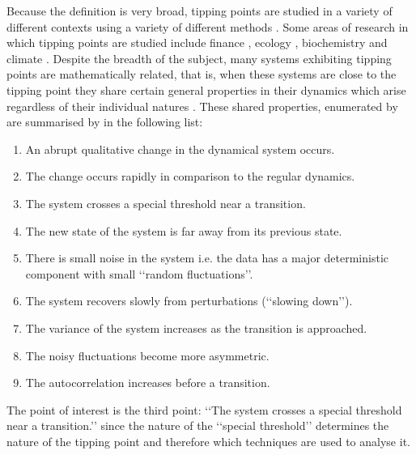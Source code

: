 Because the definition is very broad, tipping points are studied in a variety of different contexts using a variety of different methods \citep{scheffer2009critical}. Some areas of research in which tipping points are studied include finance \citep{scheffer2009}, ecology \citep{scheffer2001}, biochemistry \citep{bagowski2001bistability} and climate \citep{lenton2008}. Despite the breadth of the subject, many systems exhibiting tipping points are mathematically related, that is, when these systems are close to the tipping point they share certain general properties in their dynamics which arise regardless of their individual natures \citep{scheffer2009}. These shared properties, enumerated by \citet{scheffer2009critical} are summarised by \citet{kuehn2011mathematical} in the following list:
\begin{enumerate}
	\label{list:intro:nine}
\item An abrupt qualitative change in the dynamical system occurs. 
\item The change occurs rapidly in comparison to the regular
dynamics.
\item The system crosses a special threshold near a transition.
\item The new state of the system is far away from its previous state.
\item There is small noise in the system i.e. the data has a major deterministic component with small ‘‘random fluctuations’’.
\item The system recovers slowly from perturbations (‘‘slowing down’’).
\item The variance of the system increases as the transition is approached.
\item The noisy fluctuations become more asymmetric.
\item The autocorrelation increases before a transition.
\end{enumerate}
The point of interest is the third point: ‘‘The system crosses a special threshold near a transition.’’ since the nature of the ‘‘special threshold’’ determines the nature of the tipping point and therefore which techniques are used to analyse it. 

